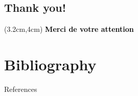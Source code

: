 \documentclass{EESD}
\begin{document}
\subsection{Thank you!}
\begin{frame}[t]{}
\begin{textblock*}{10cm}(3.2cm,4cm)
\Huge\textbf{\textcolor{black}{Merci de votre attention}}
\end{textblock*}
\end{frame}
\usebackgroundtemplate{}

\section{Bibliography}
\begin{frame}{References}\vspace{4pt}
\tiny{\printbibliography}
\end{frame}
\normalsize
\end{document}
